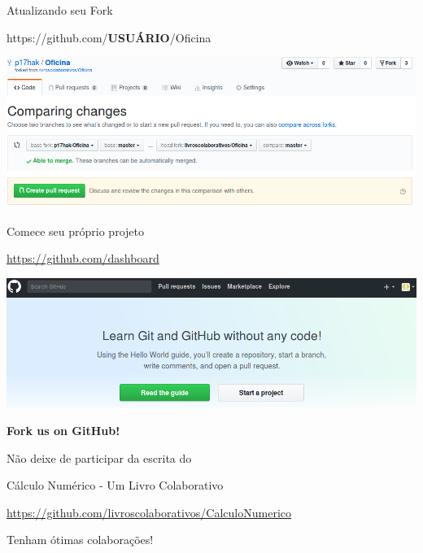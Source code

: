 \documentclass{beamer}
\begin{document}
\begin{frame}{Atualizando seu Fork}
  \begin{center}
    https://github.com/{\bf USUÁRIO}/Oficina

    \includegraphics[scale=0.3]{./figs/Sync_GitHub.png}
  \end{center}
\end{frame}


\begin{frame}{Comece seu próprio projeto}
  \begin{center}
    \url{https://github.com/dashboard}
    
    \includegraphics[scale=0.3]{./figs/Start_a_project_GitHub.png}
  \end{center}
\end{frame}

\begin{frame}{{\bf Fork us on GitHub!}}
  \begin{center}
    Não deixe de participar da escrita do

    {\Large Cálculo Numérico - Um Livro Colaborativo}

    \url{https://github.com/livroscolaborativos/CalculoNumerico}
  \end{center}
  \vspace{1cm}
  \begin{center}
    {\Huge Tenham ótimas colaborações!}
  \end{center}
\end{frame}
\end{document}
